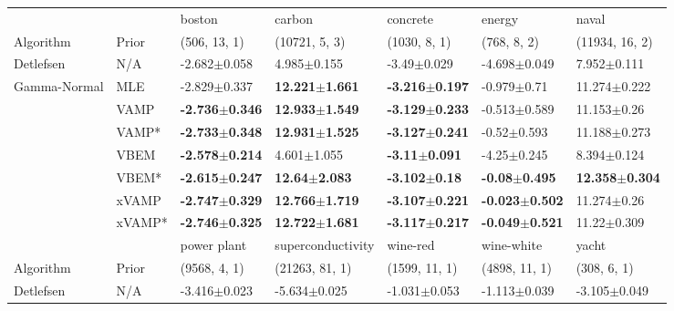 \begin{tabular}{lllllll}
\toprule
             &        &                     boston &                     carbon &                   concrete &                     energy &                      naval \\
Algorithm & Prior& (506, 13, 1)& (10721, 5, 3)& (1030, 8, 1)& (768, 8, 2)& (11934, 16, 2)\\
\midrule
Detlefsen & N/A &           -2.682$\pm$0.058 &            4.985$\pm$0.155 &            -3.49$\pm$0.029 &           -4.698$\pm$0.049 &            7.952$\pm$0.111 \\
Gamma-Normal & MLE &           -2.829$\pm$0.337 &  \textbf{12.221$\pm$1.661} &  \textbf{-3.216$\pm$0.197} &            -0.979$\pm$0.71 &           11.274$\pm$0.222 \\
             & VAMP &  \textbf{-2.736$\pm$0.346} &  \textbf{12.933$\pm$1.549} &  \textbf{-3.129$\pm$0.233} &           -0.513$\pm$0.589 &            11.153$\pm$0.26 \\
             & VAMP* &  \textbf{-2.733$\pm$0.348} &  \textbf{12.931$\pm$1.525} &  \textbf{-3.127$\pm$0.241} &            -0.52$\pm$0.593 &           11.188$\pm$0.273 \\
             & VBEM &  \textbf{-2.578$\pm$0.214} &            4.601$\pm$1.055 &   \textbf{-3.11$\pm$0.091} &            -4.25$\pm$0.245 &            8.394$\pm$0.124 \\
             & VBEM* &  \textbf{-2.615$\pm$0.247} &   \textbf{12.64$\pm$2.083} &   \textbf{-3.102$\pm$0.18} &   \textbf{-0.08$\pm$0.495} &  \textbf{12.358$\pm$0.304} \\
             & xVAMP &  \textbf{-2.747$\pm$0.329} &  \textbf{12.766$\pm$1.719} &  \textbf{-3.107$\pm$0.221} &  \textbf{-0.023$\pm$0.502} &            11.274$\pm$0.26 \\
             & xVAMP* &  \textbf{-2.746$\pm$0.325} &  \textbf{12.722$\pm$1.681} &  \textbf{-3.117$\pm$0.217} &  \textbf{-0.049$\pm$0.521} &            11.22$\pm$0.309 \\
\midrule
             &        &                power plant &          superconductivity &                   wine-red &                 wine-white &                      yacht \\
Algorithm & Prior& (9568, 4, 1)& (21263, 81, 1)& (1599, 11, 1)& (4898, 11, 1)& (308, 6, 1)\\
\midrule
Detlefsen & N/A &           -3.416$\pm$0.023 &           -5.634$\pm$0.025 &           -1.031$\pm$0.053 &           -1.113$\pm$0.039 &           -3.105$\pm$0.049 \\

\end{tabular}
